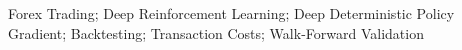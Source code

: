\acresetall
\noindent Forex Trading; Deep Reinforcement Learning; Deep Deterministic Policy Gradient; Backtesting; Transaction Costs; Walk-Forward Validation